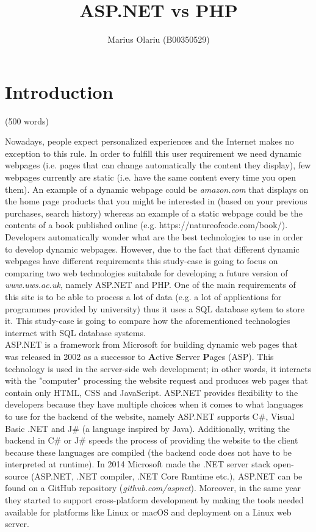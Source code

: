 \documentclass[11]{article}
\begin{document}
\title{ASP.NET vs PHP}
\author{Marius Olariu (B00350529)}
\date{}
\maketitle

\section{Introduction}(500 words)\\


	Nowadays, people expect personalized experiences and the Internet makes no exception to this rule. In order to fulfill this user requirement we need dynamic webpages (i.e. pages that can change automatically the content they display), few webpages currently are static (i.e. have the same content every time you open them). An example of a dynamic webpage could be \textit{amazon.com} that displays on the home page products that you might be interested in (based on your previous purchases, search history) whereas an example of a static webpage could be the contents of a book published online (e.g. https://natureofcode.com/book/). Developers automatically wonder what are the best technologies to use in order to develop dynamic webpages. However, due to the fact that different dynamic webpages have different requirements this study-case is going to focus on comparing two web technologies suitabale for developing a future version of \textit{www.uws.ac.uk}, namely ASP.NET and PHP. One of the main requirements of this site is to be able to process a lot of data (e.g. a lot of applications for programmes provided by university) thus it uses a SQL database sytem to store it. This study-case is going to compare how the aforementioned technologies interract with SQL database systems. \\ 
	
	ASP.NET is a framework from Microsoft for building dynamic web pages that was released in 2002 as a successor to \textbf{A}ctive \textbf{S}erver \textbf{P}ages (ASP).  This technology is used in the server-side web development; in other words, it interacts with the "computer" processing the website request and produces web pages that contain only HTML, CSS and JavaScript. ASP.NET provides flexibility to the developers because they have multiple choices when it comes to what languages to use for the backend of the website, namely ASP.NET supports C\#, Visual Basic .NET and J\# (a language inspired by Java). Additionally, writing the backend in C\# or J\# speeds the process of providing the website to the client because these languages are compiled (the backend code does not have to be interpreted at runtime). In 2014 Microsoft made the .NET server stack open-source (ASP.NET, .NET compiler, .NET Core Runtime etc.), ASP.NET can be found on a GitHub repository (\textit{github.com/aspnet}). Moreover, in the same year they started to support cross-platform development by making the tools needed available for platforms like Linux or macOS and deployment on a Linux web server.\\
	
\end{document}
